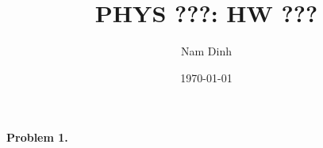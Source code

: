 \documentclass{article}
\title{\textbf{PHYS ???: HW ???}}
\author{Nam Dinh}
\date{\today}
\begin{document}
\maketitle
\thispagestyle{fancy}
\vspace{1cm}
\noindent
\textbf{Problem 1.}
\begin{mybox}

\end{mybox}
\end{document}
